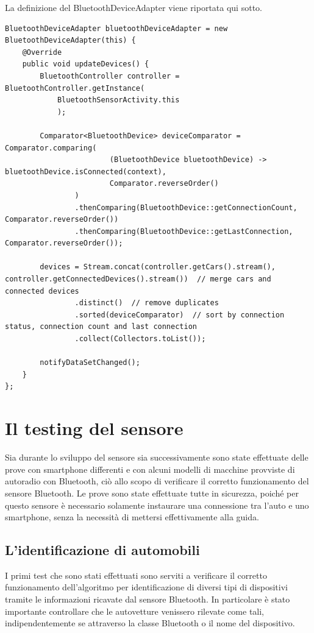 La definizione del BluetoothDeviceAdapter viene riportata qui sotto.
\begin{verbatim}
BluetoothDeviceAdapter bluetoothDeviceAdapter = new BluetoothDeviceAdapter(this) {
    @Override
    public void updateDevices() {
        BluetoothController controller = BluetoothController.getInstance(
            BluetoothSensorActivity.this
            );

        Comparator<BluetoothDevice> deviceComparator = Comparator.comparing(
                        (BluetoothDevice bluetoothDevice) -> bluetoothDevice.isConnected(context),
                        Comparator.reverseOrder()
                )
                .thenComparing(BluetoothDevice::getConnectionCount, Comparator.reverseOrder())
                .thenComparing(BluetoothDevice::getLastConnection, Comparator.reverseOrder());

        devices = Stream.concat(controller.getCars().stream(), controller.getConnectedDevices().stream())  // merge cars and connected devices
                .distinct()  // remove duplicates
                .sorted(deviceComparator)  // sort by connection status, connection count and last connection
                .collect(Collectors.toList());

        notifyDataSetChanged();
    }
};
\end{verbatim}


\section{Il testing del sensore}
Sia durante lo sviluppo del sensore sia successivamente sono state effettuate delle prove con smartphone differenti e con alcuni modelli di macchine provviste di autoradio con Bluetooth, ciò allo scopo di verificare il corretto funzionamento del sensore Bluetooth. Le prove sono state effettuate tutte in sicurezza, poiché per questo sensore è necessario solamente instaurare una connessione tra l'auto e uno smartphone, senza la necessità di mettersi effettivamente alla guida. 

\subsection{L'identificazione di automobili}
I primi test che sono stati effettuati sono serviti a verificare il corretto funzionamento dell'algoritmo per identificazione di diversi tipi di dispositivi tramite le informazioni ricavate dal sensore Bluetooth. In particolare è stato importante controllare che le autovetture venissero rilevate come tali, indipendentemente se attraverso la classe Bluetooth o il nome del dispositivo.

